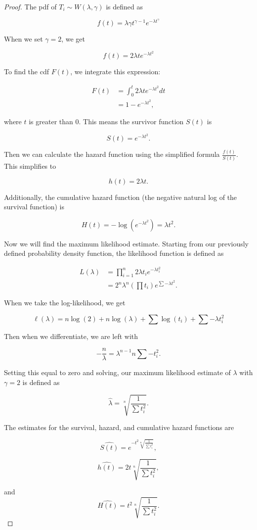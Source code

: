 \documentclass{article}
\begin{document}
	\begin{proof}
		The pdf of $T_i \sim W(\lambda, \gamma)$ is defined as 

		\[ f(t) = \lambda\gamma t^{\gamma - 1} e^{-\lambda t^\gamma} \]

		When we set $\gamma = 2$, we get 

		\[ f(t) = 2\lambda t e^{-\lambda t^2} \]

		To find the cdf $F(t)$, we integrate this expression:

		\begin{align*}
			F(t) & = \int_{0}^{t} 2\lambda t e^{-\lambda t^2} dt \\
			& = 1 - e^{- \lambda t^2},
		\end{align*}

		where $t$ is greater than 0. This means the survivor function $S(t)$ is 

		\[ S(t) = e^{- \lambda t^2}. \]

		Then we can calculate the hazard function using the simplified formula $\frac{f(t)}{S(t)}$. This simplifies to

		\[ h(t) = 2\lambda t.\]
		
		Additionally, the cumulative hazard function (the negative natural log of the survival function) is 

		\[ H(t) = -\log(e^{-\lambda t^2} ) = \lambda t^2.\]

		Now we will find the maximum likelihood estimate. Starting from our previously defined probability density function, the likelihood function is defined as 

		\begin{align*}
			L(\lambda) & = \prod_{i = 1}^{n} 2\lambda t_i e^ {-\lambda t_i^2 } \\
			& = 2^n \lambda ^ n ( \prod t_i ) e^{\sum - \lambda t^2}.
		\end{align*}

		When we take the log-likelihood, we get

		\[ \ell (\lambda) = n\log (2) + n\log(\lambda) + \sum\log(t_i) + \sum-\lambda t_i^2 \]

		Then when we differentiate, we are left with 

		\[ -\frac{n}{\lambda} = \lambda^{n - 1}n \sum-t_i^2.\]

		Setting this equal to zero and solving, our maximum likelihood estimate of $\lambda$ with $\gamma = 2$ is defined as 

		\[ \hat{\lambda} = \sqrt[n]{ \frac{1}{\sum t_i^2} }. \]

		The estimates for the survival, hazard, and cumulative hazard functions are 

		\[ \widehat{S(t)} = e^{- t^2 \sqrt[n]{ \frac{1}{\sum t_i^2} } },\]

		\[ \widehat{h(t)} = 2t \sqrt[n]{ \frac{1}{\sum t_i^2} }, \]

		and
		\[ \widehat{H(t)} = t^2 \sqrt[n]{ \frac{1}{\sum t_i^2} }. \]
	
	\end{proof}
\end{document}
